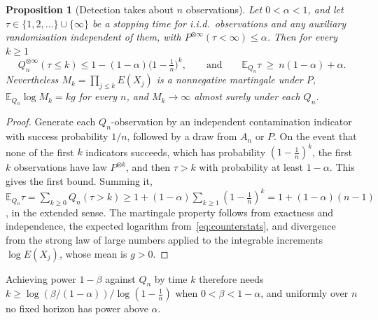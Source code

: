 \documentclass[11pt,a4paper]{article}
\newtheorem{proposition}[theorem]{Proposition}
\theoremstyle{definition}
\theoremstyle{remark}
\newcommand{\EE}{\mathbb E}
\begin{document}
\begin{proposition}[Detection takes about \(n\) observations]\label{prop:delay}
Let \(0<\alpha<1\), and let \(\tau\in\{1,2,\dots\}\cup\{\infty\}\) be a stopping time for i.i.d.\ observations and any auxiliary randomisation independent of them, with \(P^{\otimes\infty}(\tau<\infty)\le\alpha\). Then for every \(k\ge1\)
\begin{equation}\label{eq:powerupper}
 Q_n^{\otimes\infty}(\tau\le k)\le1-(1-\alpha)\bigl(1-\tfrac1n\bigr)^k,
 \qquad\text{and}\qquad
 \EE_{Q_n}\tau\ \ge\ n(1-\alpha)+\alpha .
\end{equation}
Nevertheless \(M_k=\prod_{j\le k}E(X_j)\) is a nonnegative martingale under \(P\), \(\EE_{Q_n}\log M_k=kg\) for every \(n\), and \(M_k\to\infty\) almost surely under each \(Q_n\).
\end{proposition}
\begin{proof}
Generate each \(Q_n\)-observation by an independent contamination indicator with success probability \(1/n\), followed by a draw from \(A_n\) or \(P\). On the event that none of the first \(k\) indicators succeeds, which has probability \((1-\frac1n)^k\), the first \(k\) observations have law \(P^{\otimes k}\), and then \(\tau>k\) with probability at least \(1-\alpha\). This gives the first bound. Summing it, \(\EE_{Q_n}\tau=\sum_{k\ge0}Q_n(\tau>k)\ge1+(1-\alpha)\sum_{k\ge1}(1-\frac1n)^k=1+(1-\alpha)(n-1)\), in the extended sense. The martingale property follows from exactness and independence, the expected logarithm from~\eqref{eq:counterstats}, and divergence from the strong law of large numbers applied to the integrable increments \(\log E(X_j)\), whose mean is \(g>0\).
\end{proof}

Achieving power \(1-\beta\) against \(Q_n\) by time \(k\) therefore needs \(k\ge\log(\beta/(1-\alpha))/\log(1-\frac1n)\) when \(0<\beta<1-\alpha\), and uniformly over \(n\) no fixed horizon has power above \(\alpha\).
\end{document}
